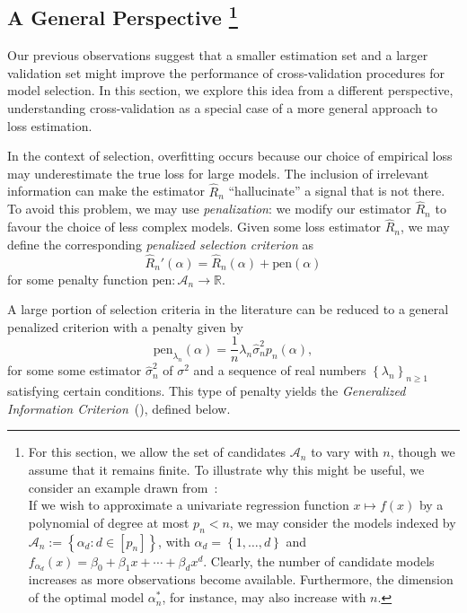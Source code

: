 \documentclass[11pt, letter paper]{article}
\newcommand{\1}{\mathmybb{1}}
\newcommand{\R}{\mathbb{R}}
\newcommand{\0}{\emptyset}
\newcommand{\paren}[1]{\left(#1 \right)}
\newcommand{\set}[1]{\left\{ #1 \right\}}
\newcommand{\Acal}{\mathcal{A}_{n}}
\newcommand{\Tcal}{\mathcal{T}_{n}}
\newcommand{\sigmahat}{\hat{\sigma}^{2}_{n}}
\newcommand{\pen}[1]{\mathrm{pen}\paren{#1}}
\begin{document}
\subsection[A general perspective]{A General Perspective \protect\footnote{For this section, we allow the set of candidates \(\Acal\) to vary with \(n\), though we assume that it remains finite. To illustrate why this might be useful, we consider an example drawn from~\textcite{shao_1997}:\\ \indent If we wish to approximate a univariate regression function \(x\mapsto f(x)\) by a polynomial of degree at most \(p_{n}< n\), we may consider the models indexed by \(\Acal:=\set{\alpha_{d}:d\in[p_n]}\), with \(\alpha_{d} = \set{1,\ldots,d}\) and \(f_{\alpha_{d}}(x) = \beta_{0} + \beta_{1}x + \cdots + \beta_{d}x^{d}\). Clearly, the number of candidate models increases as more observations become available. Furthermore, the dimension of the optimal model \(\alpha^{*}_{n}\), for instance, may also increase with \(n\).}}\label{sec:gic}
\renewcommand{\Acal}{\mathcal{A}_{n}}
\renewcommand{\Tcal}{\mathcal{T}_{n}}

Our previous observations suggest that a smaller estimation set and a larger validation set might improve the performance of cross-validation procedures for model selection. In this section, we explore this idea from a different perspective, understanding cross-validation as a special case of a more general approach to loss estimation.

In the context of selection, overfitting occurs because our choice of empirical loss may underestimate the true loss for large models. The inclusion of irrelevant information can make the estimator \(\hat{R}_{n}\) ``hallucinate'' a signal that is not there. To avoid this problem, we may use \emph{penalization}: we modify our estimator \(\hat{R}_{n}\) to favour the choice of less complex models. Given some loss estimator \(\hat{R}_{n}\), we may define the corresponding \emph{penalized selection criterion} as
\[\hat{R}_{n}'(\alpha) = \hat{R}_{n}(\alpha) + \pen{\alpha}\]
for some penalty function \(\mathrm{pen}:\Acal\to\R\). 

A large portion of selection criteria in the literature can be reduced to a general penalized criterion with a penalty given by 
\[\mathrm{pen}_{\lambda_{n}}(\alpha) = \frac{1}{n} \lambda_{n} \sigmahat p_{n}(\alpha),\]
for some some estimator \(\sigmahat\) of \(\sigma^{2}\) and a sequence of real numbers \(\set{\lambda_{n}}_{n\geq 1}\) satisfying certain conditions. This type of penalty yields the \emph{Generalized Information Criterion}~(\cite{shao_1997}), defined below.
\end{document}
